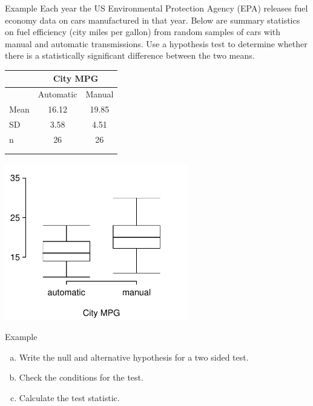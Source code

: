 \documentclass[10pt, fleqn]{beamer}
\begin{document}
\begin{frame}{Example}
Each year the US Environmental Protection Agency (EPA) releases fuel economy data on cars manufactured in that year. Below are summary statistics on fuel efficiency (city  miles per gallon) from random samples of cars with manual and automatic transmissions.  Use a hypothesis test to determine whether there is a statistically significant difference between the two means.
\vspace{1cm}

\noindent\begin{minipage}[c]{0.38\textwidth}
\begin{center}
\begin{tabular}{l c c }
\hline
        & \multicolumn{2}{c}{City MPG} \\
\hline
        & Automatic     & Manual         \\
Mean    & 16.12         & 19.85      \\
SD      & 3.58          & 4.51       \\
n       & 26            & 26 \\
\hline
& \\
& \\
\end{tabular}
\end{center}
\end{minipage}
\begin{minipage}[c]{0.6\textwidth}
\begin{center}
\includegraphics[width=0.6\textwidth]{fuel_eff_city_box.pdf}
\end{center}
\end{minipage}
\end{frame}

\begin{frame}{Example}
\begin{enumerate}[(a)]
\item Write the null and alternative hypothesis for a two sided test.\\
\vspace{1cm}
\item Check the conditions for the test.\\
\vspace{3cm}
\item Calculate the test statistic.\\
\vspace{2.75cm}
\end{enumerate}
\end{frame}
\end{document}
